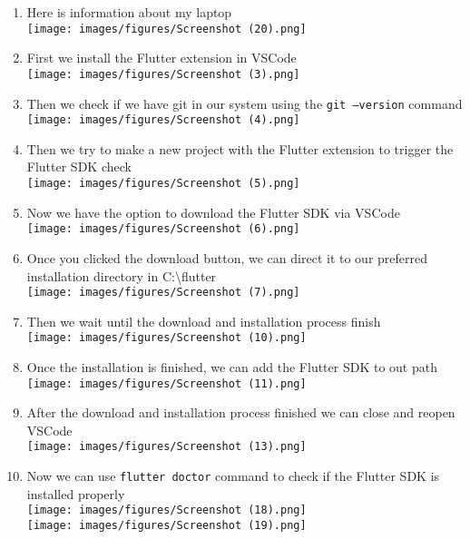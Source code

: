 \documentclass[12pt,titlepage]{article}
\begin{document}
\begin{enumerate}
    \item Here is information about my laptop \\ \texttt{[image: images/figures/Screenshot (20).png]}
    \item First we install the Flutter extension in VSCode \\ \texttt{[image: images/figures/Screenshot (3).png]}
    \newpage
    \item Then we check if we have git in our system using the \texttt{git --version} command \\ \texttt{[image: images/figures/Screenshot (4).png]}
    \item Then we try to make a new project with the Flutter extension to trigger the Flutter SDK check \\ \texttt{[image: images/figures/Screenshot (5).png]}
    \newpage
    \item Now we have the option to download the Flutter SDK via VSCode \\ \texttt{[image: images/figures/Screenshot (6).png]}
    \item Once you clicked the download button, we can direct it to our preferred installation directory in C:\textbackslash flutter \\ \texttt{[image: images/figures/Screenshot (7).png]}
    \newpage
    \item Then we wait until the download and installation process finish \\ \texttt{[image: images/figures/Screenshot (10).png]}
    \item Once the installation is finished, we can add the Flutter SDK to out path \\ \texttt{[image: images/figures/Screenshot (11).png]}
    \newpage
    \item After the download and installation process finished we can close and reopen VSCode \\ \texttt{[image: images/figures/Screenshot (13).png]}
    \newpage
    \item Now we can use \texttt{flutter doctor} command to check if the Flutter SDK is installed properly \\ \texttt{[image: images/figures/Screenshot (18).png]} \\ \texttt{[image: images/figures/Screenshot (19).png]}

\end{enumerate}
\end{document}
